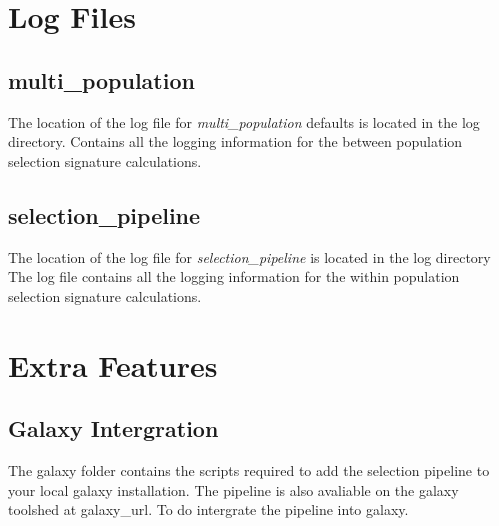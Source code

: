 \section{Log Files}
\subsection{multi\_population}
The location of the log file for  \emph{multi\_population} defaults is located in the log directory. Contains all the logging information for the between population selection signature calculations.
\subsection{selection\_pipeline}
The location of the log file for \emph{selection\_pipeline} is located in the log directory The log file contains all the logging information for the within population selection signature calculations.

\section{Extra Features}

\subsection{Galaxy Intergration}
The galaxy folder contains the scripts required to add the selection pipeline to your local galaxy installation. The pipeline is also avaliable on the galaxy toolshed at galaxy\_url. To do intergrate the pipeline into galaxy.

